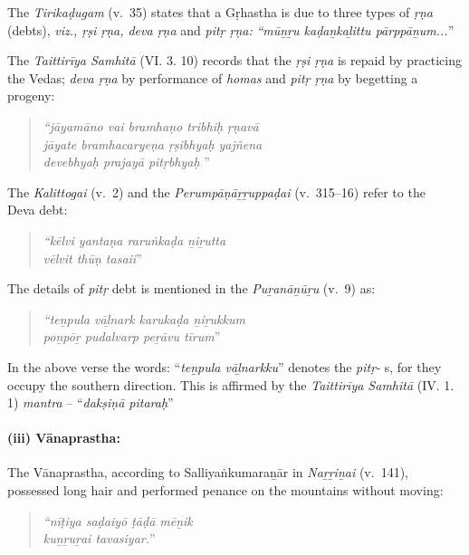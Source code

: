The \textit{Tirikaḍugam} (v.~35) states that a Gṛhastha is due to three types of \textit{ṛṇa} (debts), \textit{viz., ṛṣi ṛṇa, deva ṛṇa} and \textit{pitṛ ṛṇa:} \textit{“mūṉṟu kaḍaṉkaḻittu pārppāṉum...}”

The \textit{Taittirīya Samhitā} (VI. 3. 10) records that the \textit{ṛṣi ṛṇa} is repaid by practicing the Vedas; \textit{deva ṛṇa} by performance of \textit{homas} and \textit{pitṛ ṛṇa} by begetting a progeny:

\begin{quote}
\textit{“jāyamāno vai bramhaṇo tribhiḥ ṛṇavā}\\\textit{jāyate bramhacaryeṇa ṛṣibhyaḥ yajñena}\\\textit{devebhyaḥ prajayā pitṛbhyaḥ }”
\end{quote}

The \textit{Kalittogai} (v.~2) and the \textit{Perumpāṇāṟṟuppaḍai} (v.~315–16) refer to the \\Deva debt:

\begin{quote}
\textit{“kēlvi yantaṇa raruṅkaḍa ṉiṟutta\\ vēlvit thūṇ tasaii}”
\end{quote}

The details of \textit{pitṛ} debt is mentioned in the \textit{Puṟanāṉūṟu} (v.~9) as:

\begin{quote}
\textit{“teṉpula vāḻnark karukaḍa ṉiṟukkum}\\\textit{poṉpōṟ pudalvarp peṟāvu tīrum}”
\end{quote}

In the above verse the words: “\textit{teṉpula vāḻnarkku}” denotes the \textit{pitṛ-} s, for they occupy the southern direction. This is affirmed by the \textit{Taittirīya Samhitā} (IV. 1. 1) \textit{mantra} – “\textit{dakṣiṇā pitaraḥ}”


\paragraph*{(iii) Vānaprastha:}

\vskip -7pt

The Vānaprastha, according to Salliyaṅkumaraṉār in \textit{Naṟṟiṉai} (v.~141), possessed long hair and performed penance on the mountains without moving:

\begin{quote}
\textit{“nīṭiya saḍaiyō ṭāḍā mēṉik}\\\textit{kuṉṟuṟai tavasiyar.}”
\end{quote}


